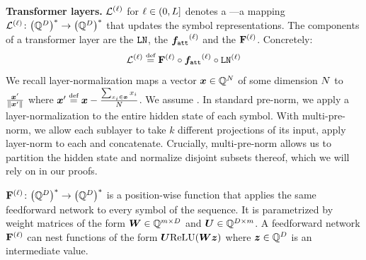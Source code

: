 \documentclass{article}
\begin{document}
\textbf{Transformer layers.}
${\mathrm{\mathcal{L}}}^{({\ell})}$ for ${\ell} \in (0,{L}]$ denotes a ---a mapping $ \tflayer^{(\layerIdx)} \colon \kleene{\mleft(\Q^\hiddDim\mright)} \to \kleene{\mleft(\Q^\hiddDim\mright)}$ that updates the symbol representations. 
The components of a transformer layer are the  ${\texttt{LN}}$, the  ${{{ \boldsymbol{f}}}_\texttt{att}}^{({\ell})}$ and the  $\ffn^{(\layerIdx)}$. Concretely:
\begin{equation}
    \tflayer^{(\layerIdx)} \defeq \ffn^{(\layerIdx)} \circ \attnfunc^{(\layerIdx)} \circ \layerNorm^{(\layerIdx)}
\end{equation}
We recall layer-normalization maps a vector ${{{ \bm{x}}}} \in {{ \mathbb{Q}}}^{{ N}}$ of some dimension ${{ N}}$ to $\frac{{{{ \bm{x}}}}'}{{{ \left\lVert {{{ \bm{x}}}}' \right\rVert}}}$ where $\vx' \defeq \vx - \frac{\sum_{\evx_\idxi \in \vx} \evx_\idxi}{\idxn}$. 
We assume  \citep{merrill2024expressivepowertransformerschain}. 
In standard pre-norm, we apply a layer-normalization to the entire hidden state of each symbol.
With multi-pre-norm, we allow each sublayer to take $k$ different projections of its input, apply layer-norm to each and concatenate. 
Crucially, multi-pre-norm allows us to partition the hidden state and normalize disjoint subsets thereof, which we will rely on in our proofs.

$\ffn^{(\layerIdx)} \colon \kleene{\mleft(\Q^\hiddDim\mright)} \to \kleene{\mleft(\Q^\hiddDim\mright)}$ is a position-wise function that applies the same feedforward network to every symbol of the sequence. It is parametrized by weight matrices of the form ${{{ \bm{W}}}} \in {{ \mathbb{Q}}}^{{{ m}} \times {{ D}}}$ and ${{{ \bm{U}}}} \in {{ \mathbb{Q}}}^{{{ D}} \times {{ m}}}$. A feedforward network $\ffn^{(\layerIdx)}$ can nest functions of the form ${{{ \bm{U}}}}{{ \mathrm{ReLU}}}({{{ \bm{W}}}}{{{ \bm{z}}}})$ where ${{{ \bm{z}}}} \in {{ \mathbb{Q}}}^{{ D}}$ is an intermediate value.
\end{document}
